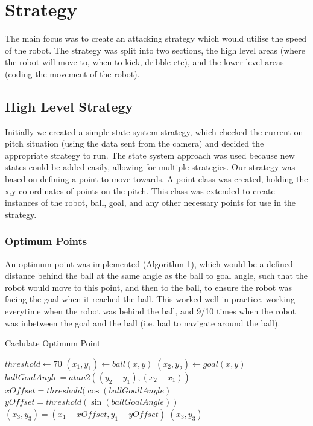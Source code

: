 \section{Strategy}

The main focus was to create an attacking strategy which would utilise the speed of the robot. The strategy was split into two sections, the high level areas (where the robot will move to, when to kick, dribble etc), and the lower level areas (coding the movement of the robot).

\subsection{High Level Strategy}
Initially we created a simple state system strategy, which checked the current on-pitch situation (using the data sent from the camera) and decided the appropriate strategy to run. The state system approach was used because new states could be added easily, allowing for multiple strategies.
Our strategy was based on defining a point to move towards. A point class was created, holding the x,y co-ordinates of points on the pitch. This class was extended to create instances of the robot, ball, goal, and any other necessary points for use in the strategy.\linebreak

\subsubsection{Optimum Points}
An optimum point was implemented (Algorithm 1), which would be a defined distance behind the ball at the same angle as the ball to goal angle, such that the robot would move to this point, and then to the ball, to ensure the robot was facing the goal when it reached the ball. This worked well in practice, working everytime when the robot was behind the ball, and 9/10 times when the robot was inbetween the goal and the ball (i.e. had to navigate around the ball).\linebreak

\begin{algorithm}
\caption{Caclulate Optimum Point}
\label{optimumPoint}
\begin{algorithmic}[1]
\STATE $threshold \gets 70$
\STATE $(x_{1}, y_{1}) \gets ball (x, y)$
\STATE $(x_{2}, y_{2}) \gets goal (x, y)$
\STATE $ballGoalAngle = atan2( (y_{2} - y_{1}), (x_{2} - x_{1}) )$
\STATE $xOffset = threshold(\cos(ballGoallAngle)$
\STATE $yOffset = threshold(\sin(ballGoalAngle))$
\STATE $(x_{3}, y_{3}) = (x_{1} - xOffset, y_{1} - yOffset)$
\RETURN $(x_{3}, y_{3})$
\end{algorithmic}
\end{algorithm}

